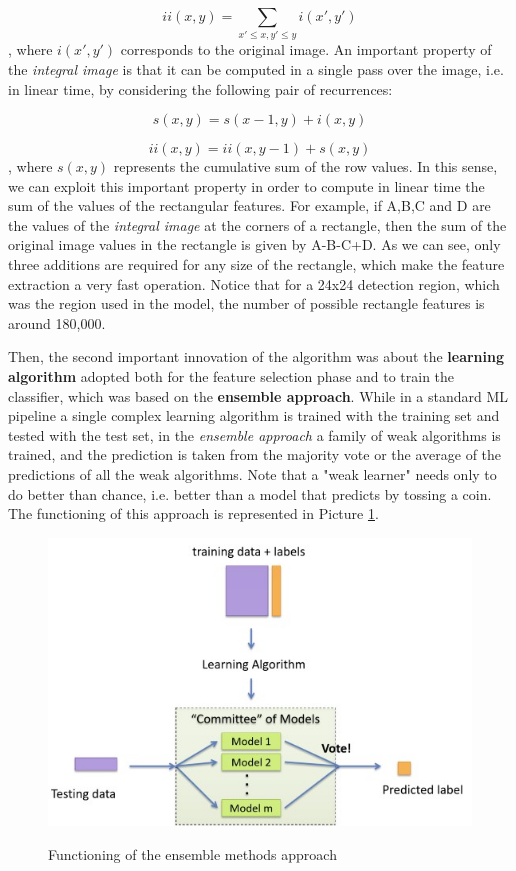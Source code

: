 $$
ii(x,y) = \sum_{x' \leq x, y' \leq y} i(x',y')
$$
, where $i(x',y')$ corresponds to the original image. An important property of the \textit{integral image} is that it can be computed in a single pass over the image, i.e. in linear time, by considering the following pair of recurrences:

$$
s(x,y) = s(x-1,y) + i(x,y)
$$

$$
ii(x,y) = ii(x,y-1) + s(x,y)
$$
, where $s(x,y)$ represents the cumulative sum of the row values.
In this sense, we can exploit this important property in order to compute in linear time the sum of the values of the rectangular features. For example, if A,B,C and D are the values of the \textit{integral image} at the corners of a rectangle, then the sum of the original image values in the rectangle is given by A-B-C+D. As we can see, only three additions are required for any size of the rectangle, which make the feature extraction a very fast operation. Notice that for a 24x24 detection region, which was the region used in the model, the number of possible rectangle features is around 180,000.

Then, the second important innovation of the algorithm was about the \textbf{learning algorithm} adopted both for the feature selection phase and to train the classifier, which was based on the \textbf{ensemble approach}. While in a standard ML pipeline a single complex learning algorithm is trained with the training set and tested with the test set, in the \textit{ensemble approach} a family of weak algorithms is trained, and the prediction is taken from the majority vote or the average of the predictions of all the weak algorithms. Note that a "weak learner" needs only to do better than chance, i.e. better than a model that predicts by tossing a coin. The functioning of this approach is represented in Picture \ref{ensemble}.

\begin{figure}[h!]
		\centering
		\includegraphics[scale = 1.4]{img/enseble.jpg}
        \label{ensemble}
        \caption{Functioning of the ensemble methods approach}
\end{figure}

